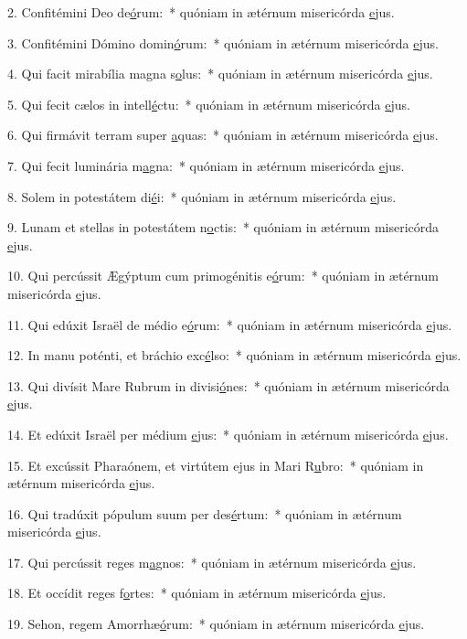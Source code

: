 2. Confitémini Deo de\uline{ó}rum:~* quóniam in ætérnum misericórda \uline{e}jus.\par 
3. Confitémini Dómino domin\uline{ó}rum:~* quóniam in ætérnum misericórda \uline{e}jus.\par 
4. Qui facit mirabília magna s\uline{o}lus:~* quóniam in ætérnum misericórda \uline{e}jus.\par 
5. Qui fecit cælos in intell\uline{é}ctu:~* quóniam in ætérnum misericórda \uline{e}jus.\par 
6. Qui firmávit terram super \uline{a}quas:~* quóniam in ætérnum misericórda \uline{e}jus.\par 
7. Qui fecit luminária m\uline{a}gna:~* quóniam in ætérnum misericórda \uline{e}jus.\par 
8. Solem in potestátem di\uline{é}i:~* quóniam in ætérnum misericórda \uline{e}jus.\par 
9. Lunam et stellas in potestátem n\uline{o}ctis:~* quóniam in ætérnum misericórda \uline{e}jus.\par 
10. Qui percússit Ægýptum cum primogénitis e\uline{ó}rum:~* quóniam in ætérnum misericórda \uline{e}jus.\par 
11. Qui edúxit Israël de médio e\uline{ó}rum:~* quóniam in ætérnum misericórda \uline{e}jus.\par 
12. In manu poténti, et bráchio exc\uline{é}lso:~* quóniam in ætérnum misericórda \uline{e}jus.\par 
13. Qui divísit Mare Rubrum in divisi\uline{ó}nes:~* quóniam in ætérnum misericórda \uline{e}jus.\par 
14. Et edúxit Israël per médium \uline{e}jus:~* quóniam in ætérnum misericórda \uline{e}jus.\par 
15. Et excússit Pharaónem, et virtútem ejus in Mari R\uline{u}bro:~* quóniam in ætérnum misericórda \uline{e}jus.\par 
16. Qui tradúxit pópulum suum per des\uline{é}rtum:~* quóniam in ætérnum misericórda \uline{e}jus.\par 
17. Qui percússit reges m\uline{a}gnos:~* quóniam in ætérnum misericórda \uline{e}jus.\par 
18. Et occídit reges f\uline{o}rtes:~* quóniam in ætérnum misericórda \uline{e}jus.\par 
19. Sehon, regem Amorrhæ\uline{ó}rum:~* quóniam in ætérnum misericórda \uline{e}jus.\par 
